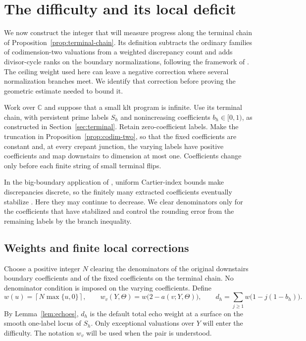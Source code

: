 \section{The difficulty and its local deficit}
\label{sec:difficulty-setup}

We now construct the integer that will measure progress along the
terminal chain of Proposition~\ref{prop:terminal-chain}.  Its definition
subtracts the ordinary families of codimension-two valuations from a
weighted discrepancy count and adds divisor-cycle ranks on the boundary
normalizations, following the framework of \cite[Section~2]{AHK}.
The ceiling weight used here can leave a negative correction where
several normalization branches meet.  We identify that correction
before proving the geometric estimate needed to bound it.

Work over $\mathbb C$ and suppose that a small klt program is infinite.
Use its terminal chain, with persistent prime labels $S_h$ and
nonincreasing coefficients $b_h\in[0,1)$, as constructed in
Section~\ref{sec:terminal}.  Retain zero-coefficient labels.  Make the
truncation in Proposition~\ref{prop:codim-two}, so that the fixed
coefficients are constant and, at every crepant junction, the varying
labels have positive coefficients and map downstairs to dimension at
most one.  Coefficients change only before each finite string of
small terminal flips.

In the big-boundary application of \cite{HanLiuZhuang2025}, uniform
Cartier-index bounds make discrepancies discrete, so the finitely many
extracted coefficients eventually stabilize
\cite[Lemma~3.4 and the proof of Theorem~3.1]{HanLiuZhuang2025}.
Here they may continue to decrease.  We clear denominators only for the
coefficients that have stabilized and control the rounding error from
the remaining labels by the branch inequality.

\subsection{Weights and finite local corrections}

Choose a positive integer \(N\) clearing the denominators of the
original downstairs boundary coefficients and of the fixed
coefficients on the terminal chain.  No denominator condition is
imposed on the varying coefficients.  Define
\begin{equation}
\label{eq:difficulty-weights}
 w(u)=\left\lceil N\max\{u,0\}\right\rceil,
 \qquad
 w_v(Y,\Theta)=w\bigl(2-a(v;Y,\Theta)\bigr),
 \qquad
 d_h=\sum_{j\geq 1}w\bigl(1-j(1-b_h)\bigr).
\end{equation}
By Lemma~\ref{lem:echoes}, $d_h$ is the default total echo weight
at a surface on the smooth one-label locus of $S_h$.
Only exceptional valuations over \(Y\) will enter the difficulty.
The notation \(w_v\) will be used when the pair is understood.

